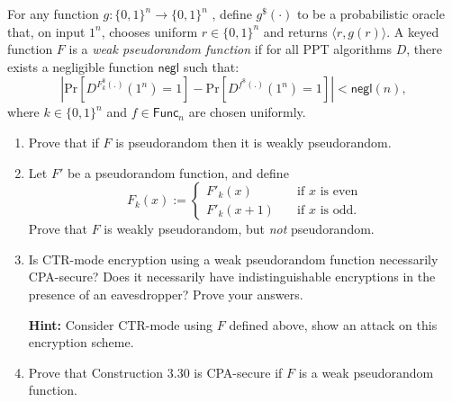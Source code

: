 \documentclass[a4paper,10pt,landscape,twocolumn]{scrartcl}
\begin{document}
\begin{bonusexercise}
  For any function $g : \{0, 1\}^n \to \{0, 1\}^n$ , define $g^{\$} (·)$ to be a probabilistic oracle that, on input $1^n$, chooses uniform $r \in \{0, 1\}^n$ and returns $\langle r, g(r)\rangle$. A keyed function $F$ is a \emph{weak pseudorandom function} if for all PPT algorithms $D$, there exists a negligible function $\mathsf{negl}$ such that:
  \begin{equation}
  \left\lvert  \text{Pr}[ D^{F_k^{\$}(.)}(1^n)=1 ]-\text{Pr}[ D^{f^{\$}(.)}(1^n)=1 ]  \right\rvert < \mathsf{negl}(n),
  \end{equation}
where $k \in \{0, 1\}^n$ and $f \in \mathsf{Func}_n$ are chosen uniformly.
\begin{enumerate}[label=(\alph*)]
\item Prove that if $F$ is pseudorandom then it is weakly pseudorandom.
\item Let $F'$ be a pseudorandom function, and define
\begin{equation}
F_k(x):=\begin{cases}
    F'_k(x)     & \quad \text{if } x \text{ is even}\\
    F'_k(x+1)  & \quad \text{if } x \text{ is odd.}
  \end{cases}
\end{equation}
Prove that $F$ is weakly pseudorandom, but \emph{not} pseudorandom.
\item Is CTR-mode encryption using a weak pseudorandom function necessarily CPA-secure? Does it necessarily have indistinguishable encryptions in the presence of an eavesdropper? Prove your answers.

 \textbf{Hint:} Consider CTR-mode using $F$ defined above, show an attack on this encryption scheme.
\item Prove that Construction 3.30 is CPA-secure if $F$ is a weak pseudorandom function.
\end{enumerate}
\end{bonusexercise}
\end{document}
